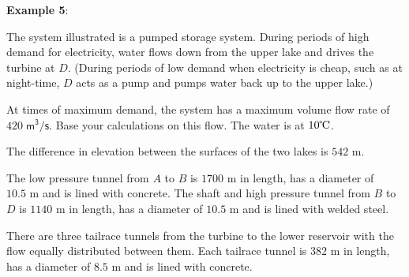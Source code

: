 \documentclass[10pt]{amsart}
\begin{document}
\begin{multicols}{2}

\end{multicols}

\pagebreak


\vfill
\pagebreak



\textbf{Example 5}:




The system illustrated is a pumped storage system. During periods of high demand for electricity, water flows down
from the upper lake and drives the turbine at $D$. (During periods of low demand when electricity is cheap, such as at
night-time, $D$ acts as a pump and pumps water back up to the upper lake.)
\par\medskip
At times of maximum demand, the system has a maximum volume flow rate of $420\;\mathsf{m^3/s}$. Base your
calculations on this flow. The water is at $10\text{\textcelsius}$.
\par\medskip
The difference in elevation between the surfaces of the two lakes is $542\text{	m}$. \par\medskip
The low pressure tunnel from $A$ to $B$ is $1700\text{ m}$ in length, has a diameter of $10.5\text{ m}$
and is lined with concrete. The shaft and high pressure tunnel from $B$ to $D$ is $1140\text{ m}$ in length, has a diameter of $10.5\text{ m}$ and
is lined with welded steel.
\par\medskip
There are three tailrace tunnels from the turbine to the lower reservoir with the flow equally
distributed between them. Each tailrace tunnel is $382\text{ m}$ in
length, has a diameter of $8.5\text{ m}$ and is lined with concrete.
\end{document}
